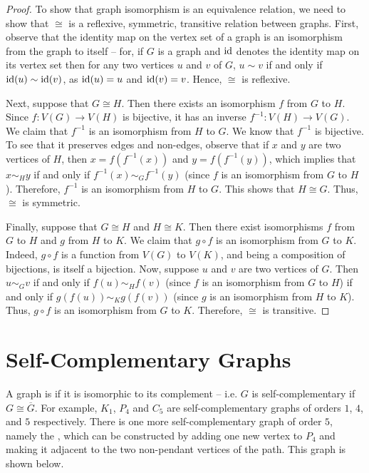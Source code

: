 \begin{proof}
To show that graph isomorphism is an equivalence relation, we need to show that $\cong$ is a reflexive, symmetric, transitive relation between graphs. First, observe that the identity map on the vertex set of a graph is an isomorphism from the graph to itself -- for, if $G$ is a graph and $\mathrm{id}$ denotes the identity map on its vertex set then for any two vertices $u$ and $v$ of $G$, $u \sim v$ if and only if $\mathrm{id}(u) \sim \mathrm{id}(v)$, as $\mathrm{id}(u) = u$ and $\mathrm{id}(v) = v$. Hence, $\cong$ is reflexive.

Next, suppose that $G \cong H$. Then there exists an isomorphism $f$ from $G$ to $H$. Since $f \colon V(G) \to V(H)$ is bijective, it has an inverse $f^{-1} \colon V(H) \to V(G)$. We claim that $f^{-1}$ is an isomorphism from $H$ to $G$. We know that $f^{-1}$ is bijective. To see that it preserves edges and non-edges, observe that if $x$ and $y$ are two vertices of $H$, then $x = f(f^{-1}(x))$ and $y = f(f^{-1}(y))$, which implies that $x \sim_H y$ if and only if $f^{-1}(x) \sim_G f^{-1}(y)$ (since $f$ is an isomorphism from $G$ to $H$). Therefore, $f^{-1}$ is an isomorphism from $H$ to $G$. This shows that $H \cong G$. Thus, $\cong$ is symmetric.

Finally, suppose that $G \cong H$ and $H \cong K$. Then there exist isomorphisms $f$ from $G$ to $H$ and $g$ from $H$ to $K$. We claim that $g \circ f$ is an isomorphism from $G$ to $K$. Indeed, $g \circ f$ is a function from $V(G)$ to $V(K)$, and being a composition of bijections, is itself a bijection. Now, suppose $u$ and $v$ are two vertices of $G$. Then $u \sim_G v$ if and only if $f(u) \sim_H f(v)$ (since $f$ is an isomorphism from $G$ to $H$) if and only if $g(f(u)) \sim_K g(f(v))$ (since $g$ is an isomorphism from $H$ to $K$). Thus, $g \circ f$ is an isomorphism from $G$ to $K$. Therefore, $\cong$ is transitive.
\end{proof}


\section{Self-Complementary Graphs}\label{sec:SC}

A graph is  if it is isomorphic to its complement -- i.e. $G$ is self-complementary if $G \cong \overline G$. For example, $K_1$, $P_4$ and $C_5$ are self-complementary graphs of orders $1$, $4$, and $5$ respectively. There is one more self-complementary graph of order $5$, namely the , which can be constructed by adding one new vertex to $P_4$ and making it adjacent to the two non-pendant vertices of the path. This graph is shown below.

